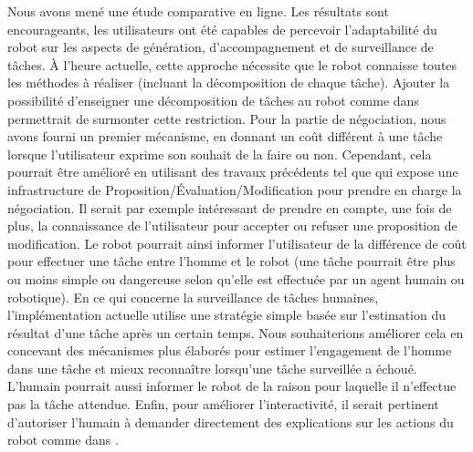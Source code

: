 \documentclass[a4paper,11pt,twoside]{StyleThese}
\begin{document}
Nous avons mené une étude comparative en ligne. Les résultats sont encourageants, les utilisateurs ont été capables de percevoir l'adaptabilité du robot sur les aspects de génération, d'accompagnement et de surveillance de tâches.
%
À l'heure actuelle, cette approche nécessite que le robot connaisse toutes les méthodes à réaliser (incluant la décomposition de chaque tâche). Ajouter la possibilité d'enseigner une décomposition de tâches au robot comme dans  \cite{Mohseni2015} permettrait de surmonter cette restriction.
Pour la partie de négociation, nous avons fourni un premier mécanisme, en donnant un coût différent à une tâche lorsque l'utilisateur exprime son souhait de la faire ou non. Cependant, cela pourrait être amélioré en utilisant des travaux précédents tel que \cite{chu2000conflict} qui expose une infrastructure de Proposition/Évaluation/Modification pour prendre en charge la négociation.
Il serait par exemple intéressant de prendre en compte, une fois de plus, la connaissance de l'utilisateur pour accepter ou refuser une proposition de modification. Le robot pourrait ainsi informer l'utilisateur de la différence de coût pour effectuer une tâche entre l'homme et le robot (une tâche pourrait être plus ou moins simple ou dangereuse selon qu'elle est effectuée par un agent humain ou robotique).
En ce qui concerne la surveillance de tâches humaines, l'implémentation actuelle utilise une stratégie simple basée sur l'estimation du résultat d'une tâche après un certain temps. Nous souhaiterions améliorer cela en concevant des mécanismes plus élaborés pour estimer l'engagement de l'homme dans une tâche et mieux reconnaître lorsqu'une tâche surveillée a échoué. L'humain pourrait aussi informer le robot de la raison pour laquelle il n'effectue pas la tâche attendue.
Enfin, pour améliorer l'interactivité, il serait pertinent d'autoriser l'humain à demander directement des explications sur les actions du robot comme dans  \cite{Lomas2012}.



\ifdefined{}
\else


\end{document}
